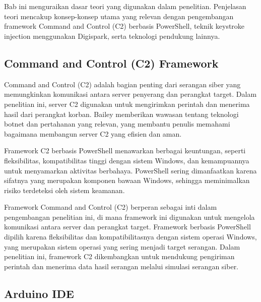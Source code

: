 \chapter{\babDua}
Bab ini menguraikan dasar teori yang digunakan dalam penelitian. Penjelasan teori mencakup konsep-konsep utama yang relevan dengan pengembangan framework Command and Control (C2) berbasis PowerShell, teknik keystroke injection menggunakan Digispark, serta teknologi pendukung lainnya.

\section{Command and Control (C2) Framework}
Command and Control (C2) adalah bagian penting dari serangan siber yang memungkinkan komunikasi antara server penyerang dan perangkat target. Dalam penelitian ini, server C2 digunakan untuk mengirimkan perintah dan menerima hasil dari perangkat korban. Bailey \citep{bailey2009survey} memberikan wawasan tentang teknologi botnet dan pertahanan yang relevan, yang membantu penulis memahami bagaimana membangun server C2 yang efisien dan aman.


Framework C2 berbasis PowerShell menawarkan berbagai keuntungan, seperti fleksibilitas, kompatibilitas tinggi dengan sistem Windows, dan kemampuannya untuk menyamarkan aktivitas berbahaya. PowerShell sering dimanfaatkan karena sifatnya yang merupakan komponen bawaan Windows, sehingga meminimalkan risiko terdeteksi oleh sistem keamanan.


Framework Command and Control (C2) berperan sebagai inti dalam pengembangan penelitian ini, di mana framework ini digunakan untuk mengelola komunikasi antara server dan perangkat target. Framework berbasis PowerShell dipilih karena fleksibilitas dan kompatibilitasnya dengan sistem operasi Windows, yang merupakan sistem operasi yang sering menjadi target serangan. Dalam penelitian ini, framework C2 dikembangkan untuk mendukung pengiriman perintah dan menerima data hasil serangan melalui simulasi serangan siber. 


\section{Arduino IDE}

